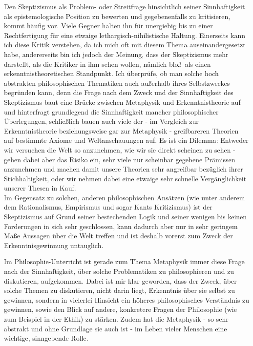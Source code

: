 \documentclass[12pt,a4paper,final]{article}
\begin{document}
Den Skeptizismus als Problem- oder Streitfrage hinsichtlich seiner Sinnhaftigkeit als epistemologische Position zu bewerten und gegebenenfalls zu kritisieren, kommt häufig vor. Viele Gegner halten ihn für unergiebig bis zu einer Rechtfertigung für eine etwaige lethargisch-nihilistische Haltung. Einerseits kann ich diese Kritik verstehen, da ich mich oft mit diesem Thema auseinandergesetzt habe, andererseits bin ich jedoch der Meinung, dass der Skeptizismus mehr darstellt, als die Kritiker in ihm sehen wollen, nämlich \glqq bloß\grqq\ als einen erkenntnistheoretischen Standpunkt.
Ich überprüfe, ob man solche hoch abstrakten philosophischen Thematiken auch außerhalb ihres Selbstzweckes begründen kann, denn die Frage nach dem Zweck und der Sinnhaftigkeit des Skeptizismus baut eine Brücke zwischen Metaphysik und Erkenntnistheorie auf und hinterfragt grundlegend die Sinnhaftigkeit mancher philosophischer Überlegungen, schließlich bauen auch viele der - im Vergleich zur Erkenntnistheorie beziehungsweise gar zur Metaphysik - greifbareren Theorien auf bestimmte Axiome und Weltanschauungen auf. Es ist ein Dilemma: Entweder wir versuchen die Welt so anzunehmen, wie wir sie direkt scheinen zu sehen - gehen dabei aber das Risiko ein, sehr viele nur scheinbar gegebene Prämissen anzunehmen und machen damit unsere Theorien sehr angreifbar bezüglich ihrer Stichhaltigkeit, oder wir nehmen dabei eine etwaige sehr schnelle Vergänglichkeit unserer Thesen in Kauf.\\
Im Gegensatz zu solchen, anderen philosophischen Ansätzen (wie unter anderem dem Rationalismus, Empirismus und sogar Kants Kritizismus) ist der Skeptizismus auf Grund seiner bestechenden Logik und seiner wenigen bis keinen Forderungen in sich sehr geschlossen, kann dadurch aber nur in sehr geringem Maße Aussagen über die Welt treffen und ist deshalb vorerst zum Zweck der Erkenntnisgewinnung untauglich.

Im Philosophie-Unterricht ist gerade zum Thema Metaphysik immer diese Frage nach der Sinnhaftigkeit, über solche Problematiken zu philosophieren und zu diskutieren, aufgekommen.
Dabei ist mir klar geworden, dass der Zweck, über solche Themen zu diskutieren, nicht darin liegt, Erkenntnis über sie selbst zu gewinnen, sondern in vielerlei Hinsicht ein höheres philosophisches Verständnis zu gewinnen, sowie den Blick auf andere, konkretere Fragen der Philosophie (wie zum Beispiel in der Ethik) zu stärken. Zudem hat die Metaphysik - so sehr abstrakt und ohne Grundlage sie auch ist - im Leben vieler Menschen eine wichtige, sinngebende Rolle.
%
\end{document}
